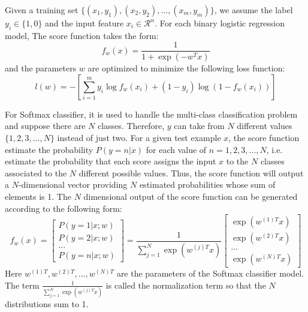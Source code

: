 Given a training set $\{(x_1,y_1),(x_2,y_2),...,(x_m,y_m)\}$, we assume the label $y_i \in \{1,0\}$ and the input feature $x_i \in \mathcal{R}^n$. For each binary logistic regression model, The score function takes the form:
\begin{equation}
	{f_w}(x) = \frac{1}{{1 + \exp ( - {w^T}x)}}
\end{equation}
and the parameters $w$ are optimized to minimize the following loss function:
\begin{equation}
	l(w) =  - [\sum\limits_{i = 1}^m {{y_i}\log {f_w}({x_i}) + (1 - {y_i})} \log (1 - {f_w}({x_i}))]\label{eq:logistic:loss}
\end{equation}

For Softmax classifier, it is used to handle the multi-class classification problem and suppose there are $N$ classes. Therefore, $y$ can take from $N$ different values $\{1,2,3,...,N\}$ instead of just two. For a given test example $x$, the score function estimate the probability $P(y=n|x)$ for each value of $n = 1,2,3,...,N$, i.e. estimate the probability that each score assigns the input $x$ to the $N$ classes associated to the $N$ different possible values. Thus, the score function will output a $N$-dimensional vector providing $N$ estimated probabilities whose sum of elements is 1. The $N$ dimensional output of the score function can be generated according to the following form:
\begin{equation}
{f_w}\left( x \right) = \left[ \begin{array}{l}
P\left( {y = 1|x;w} \right)\\
P\left( {y = 2|x;w} \right)\\
...\\
P\left( {y = n|x;w} \right)
\end{array} \right] = \frac{1}{{\sum\nolimits_{j = 1}^N {\exp \left( {{w^{(j)T}}x} \right)} }}\left[ \begin{array}{l}
\exp \left( {{w^{(1)T}}x} \right)\\
\exp \left( {{w^{(2)T}}x} \right)\\
...\\
\exp \left( {{w^{(N)T}}x} \right)
\end{array} \right]
\end{equation}
Here $w^{(1)T},w^{({2})T},...,w^{({N})T}$ are the parameters of the Softmax classifier model. The term $\frac{1}{{\sum\nolimits_{j = 1}^N {\exp \left( {{w^{(j)T}}x} \right)} }}$ is called the normalization term so that the $N$ distributions sum to 1.

